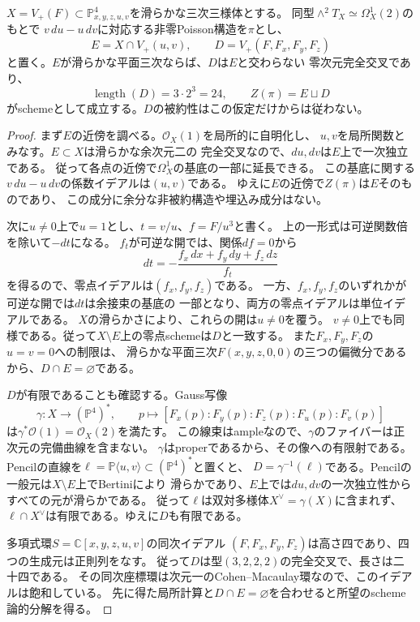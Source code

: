 \begin{proposition}[平面三次と長さ二十四の完全交叉]
\label{prop:poisson-zero-elliptic-polar}
$X=V_+(F)\subset\mathbb P^4_{x,y,z,u,v}$を滑らかな三次三様体とする。
同型$\wedge^2T_X\simeq\Omega_X^1(2)$のもとで
$v\,du-u\,dv$に対応する非零Poisson構造を$\pi$とし、
\[
 E=X\cap V_+(u,v),\qquad
 D=V_+(F,F_x,F_y,F_z)
\]
と置く。$E$が滑らかな平面三次ならば、$D$は$E$と交わらない
零次元完全交叉であり、
\[
 \operatorname{length}(D)=3\cdot2^3=24,
 \qquad Z(\pi)=E\sqcup D
\]
がschemeとして成立する。$D$の被約性はこの仮定だけからは従わない。
\end{proposition}

\begin{proof}
まず$E$の近傍を調べる。$\mathcal O_X(1)$を局所的に自明化し、
$u,v$を局所関数とみなす。$E\subset X$は滑らかな余次元二の
完全交叉なので、$du,dv$は$E$上で一次独立である。
従って各点の近傍で$\Omega_X^1$の基底の一部に延長できる。
この基底に関する$v\,du-u\,dv$の係数イデアルは$(u,v)$である。
ゆえに$E$の近傍で$Z(\pi)$は$E$そのものであり、
この成分に余分な非被約構造や埋込み成分はない。

次に$u\ne0$上で$u=1$とし、$t=v/u$、$f=F/u^3$と書く。
上の一形式は可逆関数倍を除いて$-dt$になる。
$f_t$が可逆な開では、関係$df=0$から
\[
 dt=-\frac{f_x\,dx+f_y\,dy+f_z\,dz}{f_t}
\]
を得るので、零点イデアルは$(f_x,f_y,f_z)$である。
一方、$f_x,f_y,f_z$のいずれかが可逆な開では$dt$は余接束の基底の
一部となり、両方の零点イデアルは単位イデアルである。
$X$の滑らかさにより、これらの開は$u\ne0$を覆う。
$v\ne0$上でも同様である。従って$X\setminus E$上の零点schemeは$D$と一致する。
また$F_x,F_y,F_z$の$u=v=0$への制限は、
滑らかな平面三次$F(x,y,z,0,0)$の三つの偏微分であるから、$D\cap E=\varnothing$である。

$D$が有限であることも確認する。Gauss写像
\[
 \gamma:X\longrightarrow(\mathbb P^4)^*,\qquad
 p\longmapsto[F_x(p):F_y(p):F_z(p):F_u(p):F_v(p)]
\]
は$\gamma^*\mathcal O(1)=\mathcal O_X(2)$を満たす。
この線束はampleなので、$\gamma$のファイバーは正次元の完備曲線を含まない。
$\gamma$はproperであるから、その像への有限射である。
Pencilの直線を$\ell=\mathbb P\langle u,v\rangle\subset(\mathbb P^4)^*$と置くと、
$D=\gamma^{-1}(\ell)$である。Pencilの一般元は$X\setminus E$上でBertiniにより
滑らかであり、$E$上では$du,dv$の一次独立性からすべての元が滑らかである。
従って$\ell$は双対多様体$X^\vee=\gamma(X)$に含まれず、
$\ell\cap X^\vee$は有限である。ゆえに$D$も有限である。

多項式環$S=\mathbb C[x,y,z,u,v]$の同次イデアル
$(F,F_x,F_y,F_z)$は高さ四であり、四つの生成元は正則列をなす。
従って$D$は型$(3,2,2,2)$の完全交叉で、長さは二十四である。
その同次座標環は次元一のCohen--Macaulay環なので、このイデアルは飽和している。
先に得た局所計算と$D\cap E=\varnothing$を合わせると所望のscheme論的分解を得る。
\end{proof}


